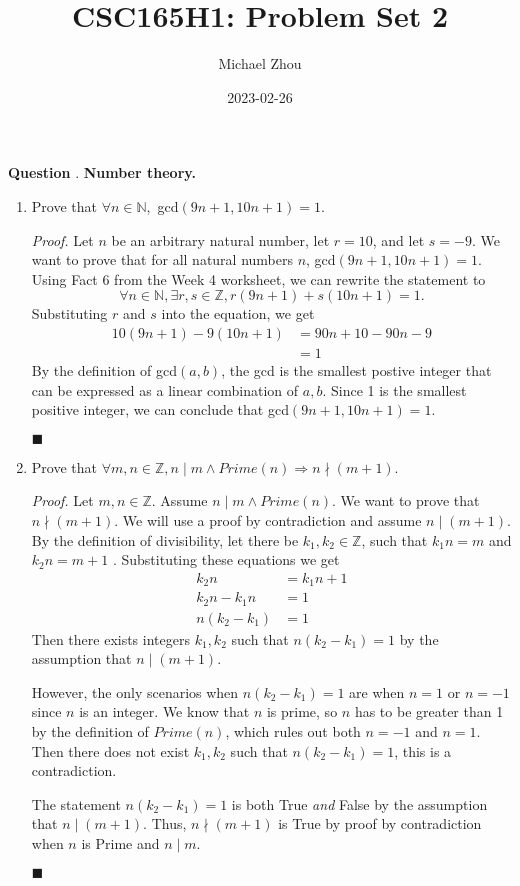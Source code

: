 \documentclass{article}
\title{CSC165H1: Problem Set 2}
\author{Michael Zhou}
\date{2023-02-26}
\newcounter{qcount}
\newcommand\q{\stepcounter{qcount} \textbf{Question \theqcount}. }
\newcommand\qedsymbol{\hfill$\blacksquare$}
\begin{document}
\maketitle

\q \textbf{Number theory.}

\begin{enumerate}[label=(\alph*)]
    \item Prove that $\forall n \in \mathbb{N},$ gcd$(9n+1, 10n+1) = 1$.

        \textit{Proof.} Let $n $ be an arbitrary natural number, 
        let $r = 10$, and let $s = -9$. We want to prove that for all 
        natural numbers $n$, gcd$ (9n+1, 10n+1) = 1$. 
         Using Fact 6 from the Week 4 worksheet, 
        we can rewrite the statement to $$\forall n \in \mathbb{N}, 
        \exists r, s \in \mathbb{Z}, r(9n + 1) + s(10n + 1) = 1.$$
        Substituting $r $ and $s$ into the equation, we get 
        \begin{align*}
            10(9n+1) - 9(10n + 1) &= 90n + 10 - 90n - 9 \\
                                  &= 1 
        \end{align*}
        By the definition of gcd$ (a, b)$, the gcd is the smallest postive 
        integer that can be expressed as a linear combination of $a, b$. 
        Since 1 is the smallest positive integer, we can conclude that 
        gcd$(9n + 1, 10n + 1) = 1$. 
        
        \qedsymbol
    \item Prove that $\forall m, n \in \mathbb{Z}, n \mid m \land Prime(n) 
        \Rightarrow n \nmid (m + 1)$.
        
        \textit{Proof.} Let $m, n \in \mathbb{Z}$. Assume $n \mid m \land 
        Prime(n).$ We want to prove that $n \nmid (m + 1)$. We will use a 
        proof by contradiction and assume $n \mid (m + 1)$. By the definition 
        of divisibility, let there be $k_1, k_2 \in \mathbb{Z}$, 
        such that $k_1n = m $ and $k_2n = m+1$ . Substituting these equations we get 
        \begin{align*}
            k_2n &= k_1n + 1 \\
            k_2n - k_1n &= 1 \\
            n(k_2 - k_1) &= 1 
        \end{align*}
        Then there exists integers $k_1, k_2$ such that $n(k_2 - k_1) = 1$ by 
        the assumption that $n \mid (m + 1)$. 

        However, the only scenarios when 
        $n(k_2 - k_1) = 1$ are when $n = 1$ or $n = -1$ since $n$ is an 
        integer. We know that $n$ is prime, 
        so $n$ has to be greater than 1 by the definition of $Prime(n)$, 
        which rules out both $n = -1$ and $n = 1$. Then there does not 
        exist $k_1, k_2$ such that $n (k_2 - k_1) = 1$, this is a contradiction. 

        The statement $n(k_2 - k_1) = 1$ is both True \textit{and}
        False by the assumption that $n \mid (m + 1)$. Thus, $n \nmid (m + 1)$ is 
        True by proof by contradiction when $n$ is Prime and $n \mid m$.

        \qedsymbol
\end{enumerate}
\end{document}
